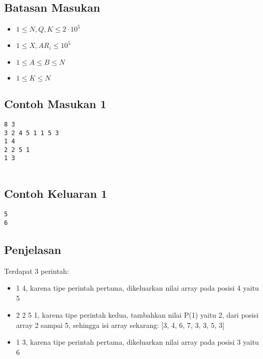 \documentclass{article}
\begin{document}
\subsection*{Batasan Masukan}
\begin{itemize}
 \item $1 \leq  N, Q, K  \leq 2 \cdot 10^5$
 \item $1 \leq  X, {AR_i}  \leq 10^5$
 \item $1 \leq  A \leq B  \leq N$
 \item $1 \leq  K \leq N$
\end{itemize}

\linebreak
\begin{multicols}{2}
\subsection*{Contoh Masukan 1}
\begin{lstlisting}
8 3
3 2 4 5 1 1 5 3
1 4 
2 2 5 1
1 3


\end{lstlisting}
\null
\columnbreak
\subsection*{Contoh Keluaran 1}
\begin{lstlisting}
5
6
\end{lstlisting}
\vfill
\null
\end{multicols}

\subsection*{Penjelasan}
Terdapat 3 perintah:
\begin{itemize}
    \item 1 4, karena tipe perintah pertama, dikeluarkan nilai array pada posisi 4 yaitu 5
    \item 2 2 5 1, karena tipe perintah kedua, tambahkan nilai P(1) yaitu 2, dari posisi array 2 sampai 5, sehingga isi array sekarang: [3, 4, 6, 7, 3, 3, 5, 3]
    \item 1 3, karena tipe perintah pertama, dikeluarkan nilai array pada posisi 3 yaitu 6
\end{itemize}
\end{document}
